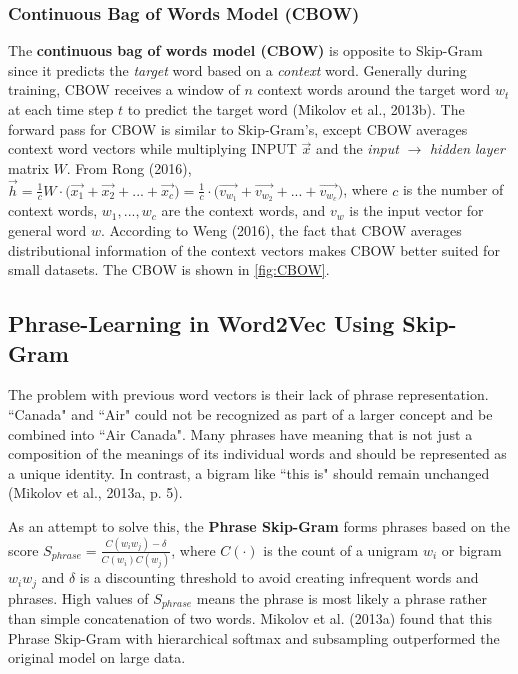 \subsubsection{Continuous Bag of Words Model (CBOW)} \label{sec:CBOW}

The \textbf{continuous bag of words model (CBOW)} is opposite to Skip-Gram since it predicts the \emph{target} word based on a \emph{context} word. Generally during training, CBOW receives a window of $n$ context words around the target word $w_t$ at each time step $t$ to predict the target word (Mikolov et al., 2013b). The forward pass for CBOW is similar to Skip-Gram's, except CBOW averages context word vectors while multiplying INPUT $\overrightarrow{x}$ and the \emph{input} $\rightarrow$ \emph{hidden layer} matrix $W$. From Rong (2016), $\overrightarrow{h} = \frac{1}{c} W \cdot \Big(\overrightarrow{x_1} + \overrightarrow{x_2} + ... + \overrightarrow{x_c} \Big) = \frac{1}{c} \cdot \Big(\overrightarrow{v_{w_1}} + \overrightarrow{v_{w_2}} + ... + \overrightarrow{v_{w_c}} \Big)$, where $c$ is the number of context words, $w_1,...,w_c$ are the context words, and $v_w$ is the input vector for general word $w$. According to Weng (2016), the fact that CBOW averages distributional information of the context vectors makes CBOW better suited for small datasets. The CBOW is shown in \cref{fig:CBOW}.


\subsection{Phrase-Learning in Word2Vec Using Skip-Gram}

The problem with previous word vectors is their lack of phrase representation. ``Canada" and ``Air" could not be recognized as part of a larger concept and be combined into ``Air Canada". Many phrases have meaning that is not just a composition of the meanings of its individual words and should be represented as a unique identity. In contrast, a bigram like ``this is" should remain unchanged (Mikolov et al., 2013a, p. 5). 

As an attempt to solve this, the \textbf{Phrase Skip-Gram} forms phrases based on the score $S_{phrase} = \frac{C(w_i w_j) - \delta} {C(w_i)C(w_j)}$, where $C(\cdot)$ is the count of a unigram $w_i$ or bigram $w_i w_j$ and $\delta$ is a discounting threshold to avoid creating infrequent words and phrases. High values of $S_{phrase}$ means the phrase is most likely a phrase rather than simple concatenation of two words. Mikolov et al. (2013a) found that this Phrase Skip-Gram with hierarchical softmax and subsampling outperformed the original model on large data. 

